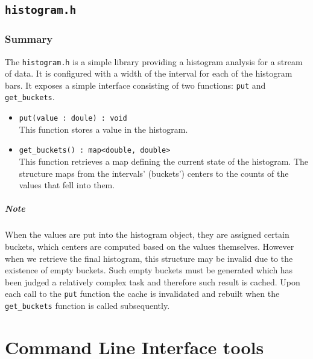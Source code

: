 \documentclass{report}
\begin{document}
\section{\texttt{histogram.h}}

	\subsection{Summary}
	The \texttt{histogram.h} is a simple library providing a histogram
	analysis for a stream of data. It is configured with a width of the
	interval for each of the histogram bars. It exposes a simple interface
	consisting of two functions: \texttt{put} and \texttt{get\_buckets}.

	\begin{itemize}
		\item \texttt{put(value : doule) : void}\\
			This function stores a value in the histogram.
		\item \texttt{get\_buckets() : map<double, double>}\\
			This function retrieves a map defining the current state
			of the histogram. The structure maps from the intervals'
			(buckets') centers to the counts of the values that fell
			into them.
	\end{itemize}

	\paragraph{Note}
	When the values are put into the histogram object, they are assigned 
	certain buckets, which centers are computed based on the values themselves.
	However when we retrieve the final histogram, this structure may be invalid
	due to the existence of empty buckets. Such empty buckets must be generated
	which has been judged a relatively complex task and therefore such result is
	cached. Upon each call to the \texttt{put} function the cache is invalidated
	and rebuilt when the \texttt{get\_buckets} function is called subsequently.

\chapter{Command Line Interface tools}

\end{document}
